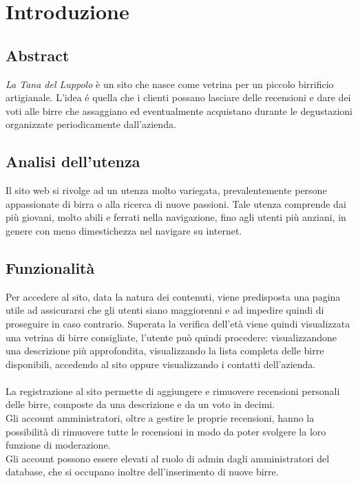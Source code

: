 \section{Introduzione}
\subsection{Abstract}
\textit{La Tana del Luppolo} è un sito che nasce come vetrina per un piccolo birrificio artigianale. L'idea é quella che i clienti possano lasciare delle recensioni e dare dei voti alle birre che assaggiano ed eventualmente acquistano durante le degustazioni organizzate periodicamente dall'azienda.
\subsection{Analisi dell'utenza}
Il sito web si rivolge ad un utenza molto variegata, prevalentemente persone appassionate di birra o alla ricerca di nuove passioni. Tale utenza comprende dai più giovani, molto abili e ferrati nella navigazione, fino agli utenti più anziani, in genere con meno dimestichezza nel navigare su internet.

\subsection{Funzionalità}
Per accedere al sito, data la natura dei contenuti, viene predisposta una pagina utile ad assicurarsi che gli utenti siano maggiorenni e ad impedire quindi di proseguire in caso contrario. Superata la verifica dell'età viene quindi visualizzata una vetrina di birre consigliate, l'utente può quindi procedere: visualizzandone una descrizione più approfondita, visualizzando la lista completa delle birre disponibili, accedendo al sito oppure visualizzando i contatti dell'azienda.\\ \\
La registrazione al sito permette di aggiungere e rimuovere recensioni personali delle birre, composte da una descrizione e da un voto in decimi.\\
Gli account amministratori, oltre a gestire le proprie recensioni, hanno la possibilità di rimuovere tutte le recensioni in modo da poter svolgere la loro funzione di moderazione.\\
Gli account possono essere elevati al ruolo di admin dagli amministratori del database, che si occupano inoltre dell'inserimento di nuove birre.

